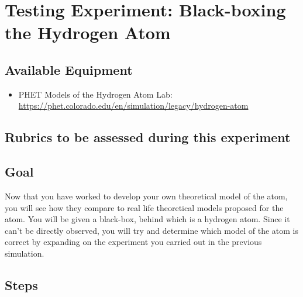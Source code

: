 \section{Testing Experiment: Black-boxing the Hydrogen Atom}

\subsection{Available Equipment}

\begin{itemize}
	\item PHET Models of the Hydrogen Atom Lab: \url{https://phet.colorado.edu/en/simulation/legacy/hydrogen-atom}
\end{itemize}

\subsection{Rubrics to be assessed during this experiment}

\subsection{Goal}
Now that you have worked to develop your own theoretical model of the atom, you will see how they compare to real life theoretical models proposed for the atom. You will be given a black-box, behind which is a hydrogen atom. Since it can't be directly observed, you will try and determine which model of the atom is correct by expanding on the experiment you carried out in the previous simulation. 

\subsection{Steps}

